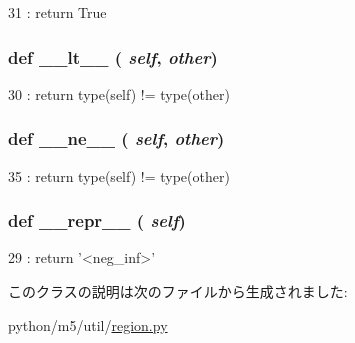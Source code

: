 \begin{DoxyCode}
31 : return True
\end{DoxyCode}
\hypertarget{classm5_1_1util_1_1region_1_1__neg__inf_a6a45920abc8ecf2d458d174ea7304f8a}{
\subsubsection[{\_\-\_\-lt\_\-\_\-}]{\setlength{\rightskip}{0pt plus 5cm}def \_\-\_\-lt\_\-\_\- ( {\em self}, \/   {\em other})}}
\label{classm5_1_1util_1_1region_1_1__neg__inf_a6a45920abc8ecf2d458d174ea7304f8a}



\begin{DoxyCode}
30 : return type(self) != type(other)
\end{DoxyCode}
\hypertarget{classm5_1_1util_1_1region_1_1__neg__inf_ad69df72a6bf0be3525fe45cd2f77f343}{
\subsubsection[{\_\-\_\-ne\_\-\_\-}]{\setlength{\rightskip}{0pt plus 5cm}def \_\-\_\-ne\_\-\_\- ( {\em self}, \/   {\em other})}}
\label{classm5_1_1util_1_1region_1_1__neg__inf_ad69df72a6bf0be3525fe45cd2f77f343}



\begin{DoxyCode}
35 : return type(self) != type(other)
\end{DoxyCode}
\hypertarget{classm5_1_1util_1_1region_1_1__neg__inf_ad8b9328939df072e4740cd9a63189744}{
\subsubsection[{\_\-\_\-repr\_\-\_\-}]{\setlength{\rightskip}{0pt plus 5cm}def \_\-\_\-repr\_\-\_\- ( {\em self})}}
\label{classm5_1_1util_1_1region_1_1__neg__inf_ad8b9328939df072e4740cd9a63189744}



\begin{DoxyCode}
29 : return '<neg_inf>'
\end{DoxyCode}


このクラスの説明は次のファイルから生成されました:\begin{DoxyCompactItemize}
\item 
python/m5/util/\hyperlink{region_8py}{region.py}\end{DoxyCompactItemize}
